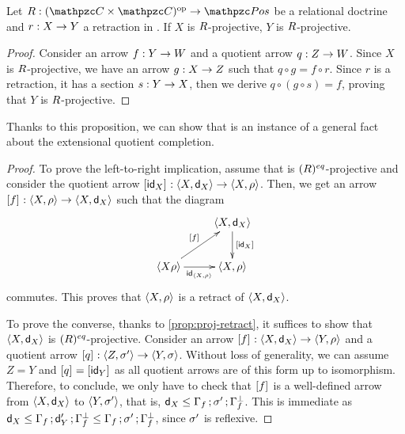 \begin{proposition}\label{prop:proj-retract}
Let $\fun{\RDoc}{\bop\CC}{\Pos}$ be a relational doctrine and $\fun{r}{X}{Y}$ a retraction in \CC. 
If $X$ is $R$-projective, $Y$ is $R$-projective. 
\end{proposition}
\begin{proof}
Consider an arrow $\fun{f}{Y}{W}$ and a quotient arrow $\fun{q}{Z}{W}$. 
Since $X$ is $R$-projective, we have an arrow 
$\fun{g}{X}{Z}$ such that 
$q\circ g = f \circ r$. 
Since $r$ is a retraction, it has a section $\fun{s}{Y}{X}$, then we derive 
$q \circ (g\circ s) = f$, proving that $Y$ is $R$-projective. 
\end{proof}

Thanks to this proposition, we can show that  is an instance of a general fact about the extensional quotient completion. 

\begin{proof}
To prove the left-to-right implication, 
assume that  is $(R)^{eq}$-projective and consider the quotient arrow $\fun{\eqc{\id_X}}{\ple{X,\rid_X}}{\ple{X,\eqrelr}}$. 
Then, we get an arrow 
$\fun{\eqc{f}}{\ple{X,\eqrelr}}{\ple{X,\rid_X}}$ 
such that the diagram  
\[\xymatrix{
& \ple{X,\rid_X} \ar[d]^-{\eqc{\id_X}} \\ 
  \ple{X\eqrelr}
  \ar[r]_-{\id_{\ple{X,\eqrelr}}}
  \ar[ur]^-{\eqc{f}} 
& \ple{X,\eqrelr}
}\]
commutes. This proves that ${\langle X,\rho \rangle }$ is a retract of ${\langle X,\mathsf{d}_X \rangle }$. 

To prove the converse, 
thanks to \cref{prop:proj-retract}, it suffices to show that ${\langle X,\mathsf{d}_X \rangle }$ is $(R)^{eq}$-projective. 
Consider an arrow 
$\fun{\eqc{f}}{\ple{X,\rid_X}}{\ple{Y,\eqrelr}}$ and a quotient arrow 
$\fun{\eqc{q}}{\ple{Z,\eqrels'}}{\ple{Y,\eqrels}}$. 
Without loss of generality, we can assume $Z = Y$ and $[q]_{} = [\mathsf{id}_Y]_{}$ as all quotient arrows are of this form up to isomorphism. 
Therefore, to conclude, we only have to check that $[f]_{}$ is a well-defined arrow from ${\langle X,\mathsf{d}_X \rangle }$ to ${\langle Y,\sigma' \rangle }$, that is, 
$\mathsf{d}_X \leq \Gamma_{f}\mathop{\mathbf{;}}\sigma'\mathop{\mathbf{;}}\Gamma_{f}^{\bot}$.
This is immediate as 
$\mathsf{d}_X \leq\Gamma_{f}\mathop{\mathbf{;}}\mathsf{d}_Y'\mathop{\mathbf{;}}\Gamma_{f}^{\bot} \leq \Gamma_{f}\mathop{\mathbf{;}}\sigma'\mathop{\mathbf{;}}\Gamma_{f}^{\bot}$, since $\sigma'$ is reflexive. 
\end{proof}



